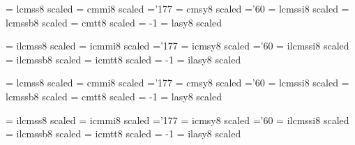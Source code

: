 
% 
\def\newfont#1#2{\@ifdefinable #1{\font #1=#2\relax}}
\def\symbol#1{\char #1\relax}


\font\fourteenrm   = lcmss8  scaled  %
\font\fourteeni    = cmmi8   scaled  %
    \skewchar\fourteeni ='177                  %
\font\fourteensy   = cmsy8   scaled  %
    \skewchar\fourteensy ='60           %
\font\fourteenit   = lcmssi8 scaled  %
\font\fourteenbf   = lcmssb8 scaled  %
\font\fourteentt   = cmtt8   scaled  %
    \hyphenchar\fourteentt = -1         %
\font\fourteenlasy = lasy8  scaled  %

\font\ifourteenrm   = ilcmss8  scaled  %
\font\ifourteeni    = icmmi8   scaled  %
    \skewchar\ifourteeni ='177                  %
\font\ifourteensy   = icmsy8   scaled  %
    \skewchar\ifourteensy ='60           %
\font\ifourteenit   = ilcmssi8 scaled  %
\font\ifourteenbf   = ilcmssb8 scaled  %
\font\ifourteentt   = icmtt8   scaled  %
    \hyphenchar\ifourteentt = -1         %
\font\ifourteenlasy = ilasy8  scaled  %

\font\seventeenrm   = lcmss8  scaled  %
\font\seventeeni    = cmmi8   scaled  %
    \skewchar\seventeeni ='177                  %
\font\seventeensy   = cmsy8   scaled  %
    \skewchar\seventeensy ='60           %
\font\seventeenit   = lcmssi8 scaled  %
\font\seventeenbf   = lcmssb8 scaled  %
\font\seventeentt   = cmtt8   scaled  %
    \hyphenchar\seventeentt = -1         %
\font\seventeenlasy = lasy8  scaled  %

\font\iseventeenrm   = ilcmss8  scaled  %
\font\iseventeeni    = icmmi8   scaled  %
    \skewchar\iseventeeni ='177                  %
\font\iseventeensy   = icmsy8   scaled  %
    \skewchar\iseventeensy ='60           %
\font\iseventeenit   = ilcmssi8 scaled  %
\font\iseventeenbf   = ilcmssb8 scaled  %
\font\iseventeentt   = icmtt8   scaled  %
    \hyphenchar\iseventeentt = -1         %
\font\iseventeenlasy = ilasy8  scaled  %

